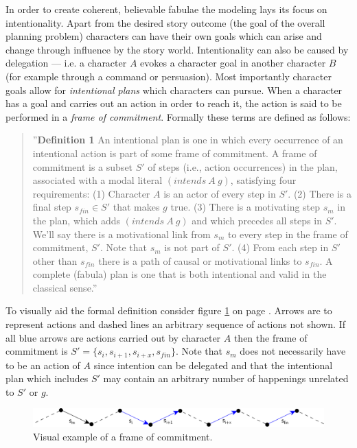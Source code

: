 In order to create coherent, believable fabulae the modeling lays its focus on intentionality. Apart from the desired story outcome (the goal of the overall planning problem) characters can have their own goals which can arise and change through influence by the story world. Intentionality can also be caused by delegation --- i.e. a character $A$ evokes a character goal in another character $B$ (for example through a command or persuasion). Most importantly character goals allow for \emph{intentional plans} which characters can pursue. When a character has a goal and carries out an action in order to reach it, the action is said to be performed in a \emph{frame of commitment}. Formally these terms are defined as follows:
\begin{quote}
''\textbf{Definition 1} An intentional plan is one in which every occurrence of an intentional action is part of some frame of commitment. A frame of commitment is a subset $S'$ of steps (i.e., action occurrences) in the plan, associated with a modal literal $(intends\ A\ g)$, satisfying four requirements: (1) Character $A$ is an actor of every step in $S'$. (2) There is a final step $s_{fin}\in S'$ that makes $g$ true. (3) There is a motivating step $s_m$ in the plan, which adds $(intends\ A\ g)$ and which precedes all steps in $S'$. We’ll say there is a motivational link from $s_m$ to every step in the frame of commitment, $S'$. Note that $s_m$ is not part of $S'$. (4) From each step in $S'$ other than $s_{fin}$ there is a path of causal or motivational links to $s_{fin}$. A complete (fabula) plan is one that is both intentional and valid in the classical sense.'' \cite{Haslum14}
\end{quote}
To visually aid the formal definition consider figure \ref{fig:intplan} on page \pageref{fig:intplan}. Arrows are to represent actions and dashed lines an arbitrary sequence of actions not shown. If all blue arrows are actions carried out by character $A$ then the frame of commitment is $S'=\{s_i,s_{i+1},s_{i+x},s_{fin}\}$. Note that $s_m$ does not necessarily have to be an action of $A$ since intention can be delegated and that the intentional plan which includes $S'$ may contain an arbitrary number of happenings unrelated to $S'$ or $g$.
\vspace{0.5cm}
\begin{figure}[htbp]
 \centering
 \includegraphics[scale=0.8]{intentional_plan}
 \caption{Visual example of a frame of commitment.}
 \label{fig:intplan}
\end{figure}

